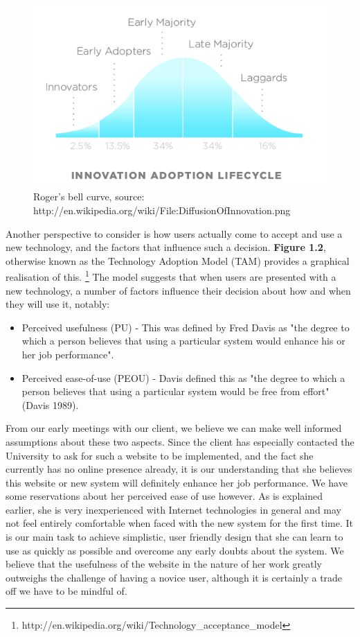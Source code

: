 \documentclass{l3proj}
\begin{document}
\begin{figure}
\begin{center}
\includegraphics[scale=0.6]{DiffusionOfInnovation}
\caption{Roger's bell curve, source: http://en.wikipedia.org/wiki/File:DiffusionOfInnovation.png}
\end{center}
\end{figure}

Another perspective to consider is how users actually come to accept and use a
new technology, and the factors that influence such a decision. \textbf{Figure
1.2}, otherwise known as the Technology Adoption Model (TAM) provides a
graphical realisation of this.
\footnote{http://en.wikipedia.org/wiki/Technology\_acceptance\_model} The model
suggests that when users are presented with a new technology, a number of
factors influence their decision about how and when they will use it, notably:

\begin{itemize}
\item Perceived usefulness (PU) - This was defined by Fred Davis as "the degree
to which a person believes that using a particular system would enhance his or
her job performance".
\item Perceived ease-of-use (PEOU) - Davis defined this as "the degree to which
a person believes that using a particular system would be free from effort"
(Davis 1989).	
\end{itemize}

From our early meetings with our client, we believe we can make well informed
assumptions about these two aspects. Since the client has especially contacted
the University to ask for such a website to be implemented, and the fact she
currently has no online presence already, it is our understanding that she
believes this website or new system will definitely enhance her job performance.
We have some reservations about her perceived ease of use however. As is
explained earlier, she is very inexperienced with Internet technologies in
general and may not feel entirely comfortable when faced with the new system for
the first time. It is our main task to achieve simplistic, user friendly design
that she can learn to use as quickly as possible and overcome any early doubts
about the system. We believe that the usefulness of the website in the nature of
her work greatly outweighs the challenge of having a novice user, although it is
certainly a trade off we have to be mindful of. 
\end{document}
